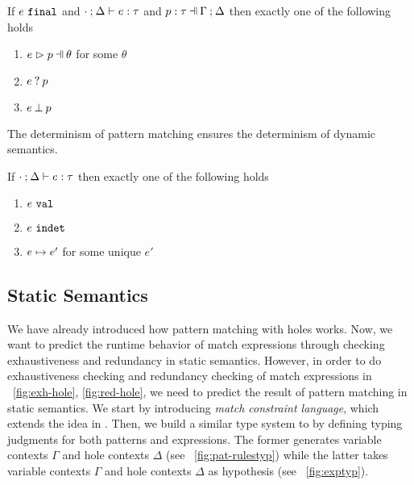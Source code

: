 \documentclass[runningheads,envcountsame,a4paper]{llncs}
\begin{document}
\begin{lemma}
  \label{lem:match-determinism}
  If $e ~\mathtt{final}$ and $\cdot \mathbin{;} \Delta \vdash e : \tau$ and $\hpattyp{p}{\tau}{\Gamma}{\Delta}$ then exactly one of the following holds
  \begin{enumerate}
    \item $\hpatmatch{e}{p}{\theta}$ for some $\theta$
    \item $e \mathbin{?} p$
    \item $e \mathbin{\bot} p$
  \end{enumerate}
\end{lemma}

The determinism of pattern matching ensures the determinism of dynamic semantics.

\begin{theorem}[Determinism]
  \label{thrm:determinism}
  If $\cdot \mathbin{;} \Delta \vdash e : \tau$ then exactly one of the following holds
  \begin{enumerate}
    \item $e ~\mathtt{val}$
    \item $e ~\mathtt{indet}$
    \item $e \mapsto e'$ for some unique $e'$
  \end{enumerate}
\end{theorem}

\subsection{Static Semantics}\label{sec:statics}

We have already introduced how pattern matching with holes works. Now, we want
to predict the runtime behavior of match expressions through checking
exhaustiveness and redundancy in static semantics. However, in order to do exhaustiveness checking and redundancy
checking of match expressions in \listfigurename~\ref{fig:exh-hole},
\ref{fig:red-hole}, we need to predict the result of pattern matching in static
semantics. We start by introducing \textit{match constraint language}, which
extends the idea in \cite{Harper2012}. Then, we build a similar type system to
\cite{DBLP:journals/pacmpl/OmarVCH19} by defining typing judgments for both
patterns and expressions. The former generates variable contexts $\Gamma$ and
hole contexts $\Delta$ (see \figurename~\ref{fig:pat-rulestyp}) while the latter 
takes variable contexts $\Gamma$ and hole contexts $\Delta$ as hypothesis (see
\figurename~\ref{fig:exptyp}).
\end{document}
